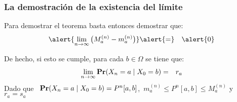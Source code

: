 \begin{frame}
\frametitle{La demostración de la existencia del límite}

{\small

Para demostrar el teorema basta entonces demostrar que:
\begin{eqnarray*}
\alert{\lim_{n \to \infty} \big(M_a^{(n)} - m_a^{(n)}\big)} & \alert{=} & \alert{0}
\end{eqnarray*}


De hecho, si esto se cumple, para cada $b \in \Omega$ se tiene que:
\begin{eqnarray*}
\lim_{n \to \infty} {\rm {\bf Pr}}(X_n = a \mid X_0 = b) & = & r_a
\end{eqnarray*}
Dado que \ ${\rm {\bf Pr}}(X_n = a \mid X_0 = b) = P^n[a,b]$,\ $m_a^{(n)} \leq P^n[a,b] \leq M_a^{(n)}$ y~~$r_a = s_a$

}

\end{frame}

